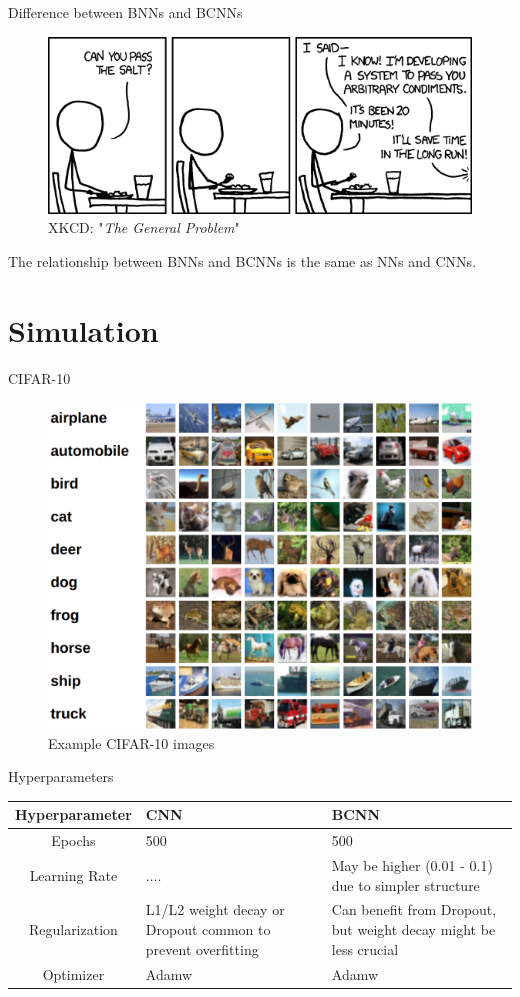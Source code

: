 \documentclass{beamer}
\begin{document}
\begin{frame}{Difference between BNNs and BCNNs}
	\begin{figure}
		\includegraphics[width=.75\textwidth]{../Images/the_general_problem.png}
		\caption{ XKCD: "\textit{The General Problem}" \cite{xkcd-general-problem}}
	\end{figure}
		The relationship between BNNs and BCNNs is the same as NNs and CNNs.
\end{frame}


\section{Simulation}

\begin{frame}{CIFAR-10}
	\begin{figure}
		\includegraphics[width=.65\textwidth]{../Images/cifar-10.png}
		\caption{Example CIFAR-10 images \cite{cifar10}}
	\end{figure}
\end{frame}

\begin{frame}{Hyperparameters}
	\centering
	\begin{tabular}{|c||p{3cm}|p{3cm}|} %
		\hline
		\textbf{Hyperparameter} & \textbf{CNN} & \textbf{BCNN} \\ [0.5ex] 
		\hline\hline
		Epochs & 500 & 500\\
		\hline
		Learning Rate & ....  & May be higher (0.01 - 0.1) due to simpler structure  \\
		\hline
		Regularization & L1/L2 weight decay or Dropout common to prevent overfitting & Can benefit from Dropout, but weight decay might be less crucial \\
		\hline
		Optimizer & Adamw  & Adamw  \\
		\hline
	\end{tabular}
\end{frame}
\end{document}
